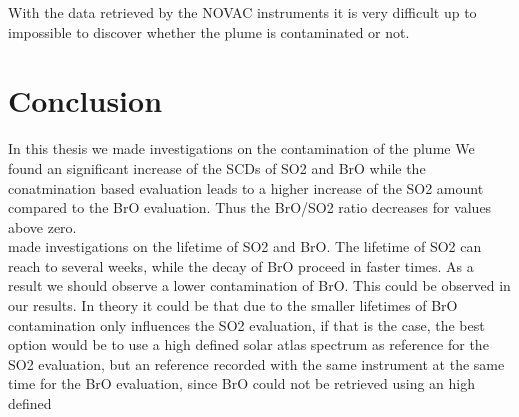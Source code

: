 \documentclass  [
  paper    = a4,
  BCOR     = 10mm,
  twoside,
  fontsize = 12pt,
  fleqn,
  toc      = bibnumbered,
  toc      = listofnumbered,
  numbers  = noendperiod,
  headings = normal,
  listof   = leveldown,
  version  = 3.03
]                                       {scrreprt}
\begin{document}
	  With the data retrieved by the NOVAC instruments it is very difficult up to impossible to discover whether the plume is contaminated or not. 




	\chapter{Conclusion}
	In this thesis we made investigations on the contamination of the plume 
	We found an significant increase of the SCDs of SO2 and BrO while the conatmination based evaluation leads to a higher increase of the SO2 amount compared to the BrO evaluation. Thus the BrO/SO2 ratio decreases for values above zero.\\
	\cite{geeignete quelle, irgendwo hab ich das schon gehoert} made investigations on the lifetime of SO2 and BrO. The lifetime of SO2 can reach to several weeks, while the decay of BrO proceed in faster times. As a result we should observe a lower contamination of BrO. This could be observed in our results. In theory it could be that due to the smaller lifetimes of BrO contamination only influences the SO2 evaluation, if that is the case, the best option would be to use a high defined solar atlas spectrum as reference for the SO2 evaluation, but an reference recorded with the same instrument at the same time for the BrO evaluation, since BrO could not be retrieved using an high defined 

	
	
	
\end{document}
